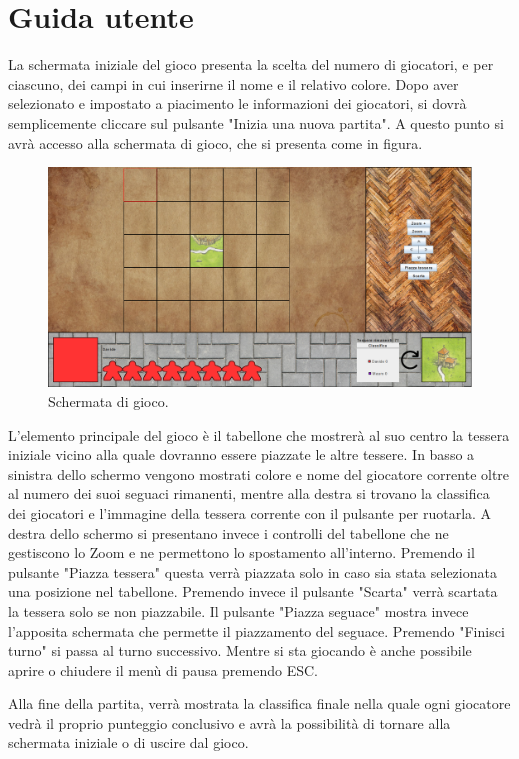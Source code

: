 \section{Guida utente}
La schermata iniziale del gioco presenta la scelta del numero di giocatori, e per ciascuno, dei campi in cui inserirne il nome e il relativo colore. Dopo aver selezionato e impostato a piacimento le informazioni dei giocatori, si dovrà semplicemente cliccare sul pulsante "Inizia una nuova partita". A questo punto si avrà accesso alla schermata di gioco, che si presenta come in figura.

\begin{figure}[ht]
    \centering\includegraphics[scale=.25]{images/board.png}
    \caption{Schermata di gioco.}
\end{figure}

L'elemento principale del gioco è il tabellone che mostrerà al suo centro la tessera iniziale vicino alla quale dovranno essere piazzate le altre tessere. In basso a sinistra dello schermo vengono mostrati colore e nome del giocatore corrente oltre al numero dei suoi seguaci rimanenti, mentre alla destra si trovano la classifica dei giocatori e l'immagine della tessera corrente con il pulsante per ruotarla. A destra dello schermo si presentano invece i controlli del tabellone che ne gestiscono lo Zoom e ne permettono lo spostamento all'interno. Premendo il pulsante "Piazza tessera" questa verrà piazzata solo in caso sia stata selezionata una posizione nel tabellone. Premendo invece il pulsante "Scarta" verrà scartata la tessera solo se non piazzabile. Il pulsante "Piazza seguace" mostra invece l'apposita schermata che permette il piazzamento del seguace. Premendo "Finisci turno" si passa al turno successivo. Mentre si sta giocando è anche possibile aprire o chiudere il menù di pausa premendo ESC.
\medskip

Alla fine della partita, verrà mostrata la classifica finale nella quale ogni giocatore vedrà il proprio punteggio conclusivo e avrà la possibilità di tornare alla schermata iniziale o di uscire dal gioco.
\medskip

